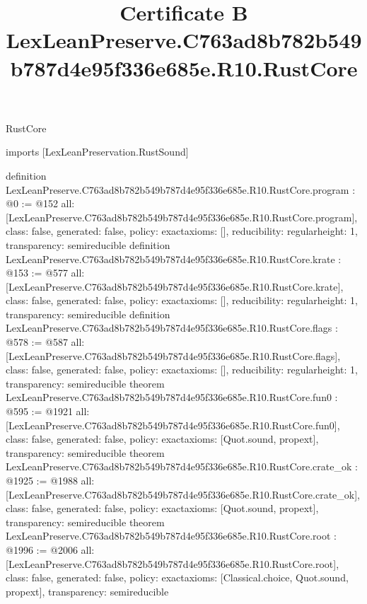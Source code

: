\begin{lexlean}{RustCore}
\title{Certificate B LexLeanPreserve.C763ad8b782b549b787d4e95f336e685e.R10.RustCore}
\begin{coremodule}
imports [LexLeanPreservation.RustSound]

definition LexLeanPreserve.C763ad8b782b549b787d4e95f336e685e.R10.RustCore.program : @0 := @152 {
  all: [LexLeanPreserve.C763ad8b782b549b787d4e95f336e685e.R10.RustCore.program],
  class: false,
  generated: false,
  policy: exact{axioms: []},
  reducibility: regular{height: 1},
  transparency: semireducible
}
definition LexLeanPreserve.C763ad8b782b549b787d4e95f336e685e.R10.RustCore.krate : @153 := @577 {
  all: [LexLeanPreserve.C763ad8b782b549b787d4e95f336e685e.R10.RustCore.krate],
  class: false,
  generated: false,
  policy: exact{axioms: []},
  reducibility: regular{height: 1},
  transparency: semireducible
}
definition LexLeanPreserve.C763ad8b782b549b787d4e95f336e685e.R10.RustCore.flags : @578 := @587 {
  all: [LexLeanPreserve.C763ad8b782b549b787d4e95f336e685e.R10.RustCore.flags],
  class: false,
  generated: false,
  policy: exact{axioms: []},
  reducibility: regular{height: 1},
  transparency: semireducible
}
theorem LexLeanPreserve.C763ad8b782b549b787d4e95f336e685e.R10.RustCore.fun0 : @595 := @1921 {
  all: [LexLeanPreserve.C763ad8b782b549b787d4e95f336e685e.R10.RustCore.fun0],
  class: false,
  generated: false,
  policy: exact{axioms: [Quot.sound, propext]},
  transparency: semireducible
}
theorem LexLeanPreserve.C763ad8b782b549b787d4e95f336e685e.R10.RustCore.crate_ok : @1925 := @1988 {
  all: [LexLeanPreserve.C763ad8b782b549b787d4e95f336e685e.R10.RustCore.crate_ok],
  class: false,
  generated: false,
  policy: exact{axioms: [Quot.sound, propext]},
  transparency: semireducible
}
theorem LexLeanPreserve.C763ad8b782b549b787d4e95f336e685e.R10.RustCore.root : @1996 := @2006 {
  all: [LexLeanPreserve.C763ad8b782b549b787d4e95f336e685e.R10.RustCore.root],
  class: false,
  generated: false,
  policy: exact{axioms: [Classical.choice, Quot.sound, propext]},
  transparency: semireducible
}


\end{coremodule}
\end{lexlean}
